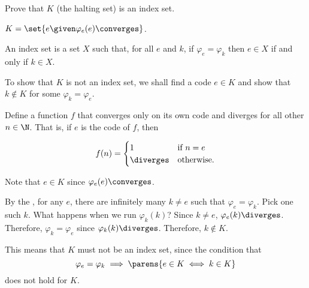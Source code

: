 \begin{problem}
  Prove that $K$ (the halting set) is  an index set.

  \begin{enumarabic}
    \item $K = \set{ e \given \varphi_e(e) \converges }$.
    \item An index set is a set $X$ such that, for all $e$ and $k$,
      if $\varphi_e = \varphi_k$ then $e \in X$ if and only if $k \in X$.
  \end{enumarabic}



  \begin{answer}

    To show that $K$ is not an index set,
    we shall find a code $e \in K$ and show that $k \not \in K$
    for some $\varphi_k = \varphi_e$.

    \step
    Define a function $f$ that converges only on its own code and diverges
    for all other $n \in \N$. That is, if $e$ is the code of $f$, then

    \[
      f(n) = \begin{cases}
        1 & \text{if } n = e \\
        \diverges & \text{otherwise.}
      \end{cases}
    \]

    \step
    Note that $e \in K$ since $\varphi_e(e) \converges$.

    By the , for any $e$, there are infinitely
    many $k \neq e$ such that $\varphi_e = \varphi_k$.
    Pick one such $k$.
    What happens when we run $\varphi_k(k)$?
    Since $k \neq e$, $\varphi_e(k) \diverges$.
    Therefore, $\varphi_k = \varphi_e$ since $\varphi_k(k) \diverges$.
    Therefore, $k \not\in K$.

    \step
    This means that $K$ must not be an index set, since
    the condition that
    \[ \varphi_e = \varphi_k \implies \parens{e \in K \iff k \in K} \]
    does not hold for $K$.
  \end{answer}
\end{problem}
